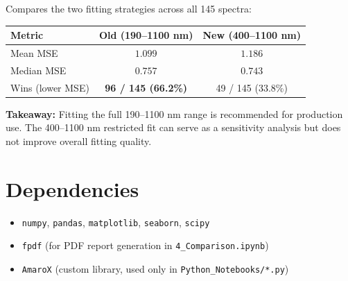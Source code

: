 \documentclass[11pt,a4paper]{article}
\begin{document}
Compares the two fitting strategies across all 145 spectra:

\begin{table}[htbp]
\centering
\begin{tabular}{lcc}
\toprule
\textbf{Metric} & \textbf{Old (190--1100 nm)} & \textbf{New (400--1100 nm)} \\
\midrule
Mean MSE      & $1.099$    & $1.186$ \\
Median MSE    & $0.757$    & $0.743$ \\
Wins (lower MSE) & \textbf{96 / 145 (66.2\%)} & 49 / 145 (33.8\%) \\
\bottomrule
\end{tabular}
\end{table}

\textbf{Takeaway:} Fitting the full 190--1100 nm range is recommended for production use. The 400--1100 nm restricted fit can serve as a sensitivity analysis but does not improve overall fitting quality.

\section{Dependencies}
\begin{itemize}
    \item {\tt numpy}, {\tt pandas}, {\tt matplotlib}, {\tt seaborn}, {\tt scipy}
    \item {\tt fpdf} (for PDF report generation in {\tt 4\_Comparison.ipynb})
    \item {\tt AmaroX} (custom library, used only in {\tt Python\_Notebooks/*.py})
\end{itemize}
\end{document}
